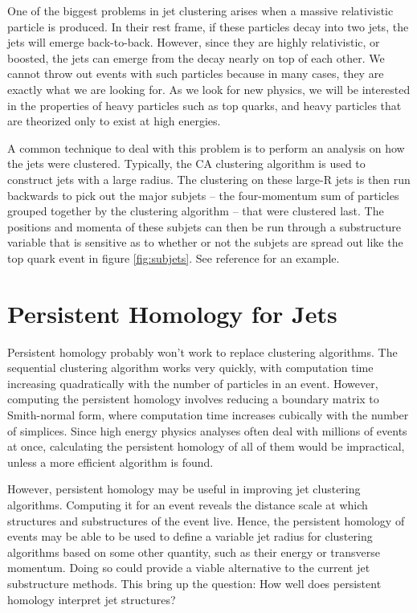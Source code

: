 \documentclass[a4paper,12pt]{report}
\begin{document}
One of the biggest problems in jet clustering arises when a massive relativistic particle is produced. In their rest frame, if these particles decay into two jets, the jets will emerge back-to-back. However, since they are highly relativistic, or boosted, the jets can emerge from the decay nearly on top of each other. We cannot throw out events with such particles because in many cases, they are exactly what we are looking for. As we look for new physics, we will be interested in the properties of heavy particles such as top quarks, and heavy particles that are theorized only to exist at high energies.

A common technique to deal with this problem is to perform an analysis on how the jets were clustered. Typically, the CA clustering algorithm is used to construct jets with a large radius. The clustering on these large-R jets is then run backwards to pick out the major subjets -- the four-momentum sum of particles grouped together by the clustering algorithm -- that were clustered last. The positions and momenta of these subjets can then be run through a substructure variable that is sensitive as to whether or not the subjets are spread out like the top quark event in figure \ref{fig:subjets}. See reference \cite{Thaler:2010} for an example.

\section{Persistent Homology for Jets}\label{sec:tdajet}
Persistent homology probably won't work to replace clustering algorithms. The sequential clustering algorithm works very quickly, with computation time increasing quadratically with the number of particles in an event. However, computing the persistent homology involves reducing a boundary matrix to Smith-normal form, where computation time increases cubically with the number of simplices. Since high energy physics analyses often deal with millions of events at once, calculating the persistent homology of all of them would be impractical, unless a more efficient algorithm is found.

However, persistent homology may be useful in improving jet clustering algorithms. Computing it for an event reveals the distance scale at which structures and substructures of the event live. Hence, the persistent homology of events may be able to be used to define a variable jet radius for clustering algorithms based on some other quantity, such as their energy or transverse momentum. Doing so could provide a viable alternative to the current jet substructure methods. This bring up the question: How well does persistent homology interpret jet structures?
\end{document}
